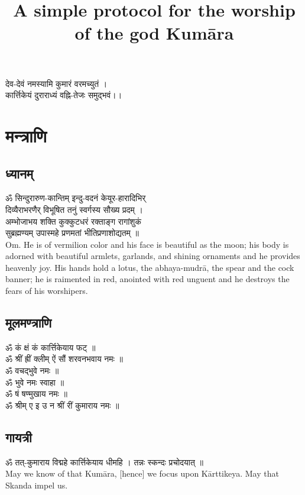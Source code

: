 \documentclass[12pt]{article}
\title{\textbf{A simple protocol for the worship of the god Kumāra}}
\author{}
\date{}
\begin{document}
\maketitle
\begin{center}
{\large {\skt
देव-देवं नमस्यामि कुमारं वरमच्युतं ।\\
कार्त्तिकेयं दुराराध्यं वह्नि-तेजः समुद्भवं।। 
}}\\
 \end{center}
\section{{\skt मन्त्राणि}}
\subsection{{\skt ध्यानम् }}
{\large {\skt ॐ सिन्दुरारुण-कान्तिम् इन्दु-वदनं केयूर-हारादिभिर् \\
दिव्यैराभरणैर् विभूषित तनुं स्वर्गस्य सौख्य प्रदम् ।\\ 
अम्भोजाभय शक्ति कुक्कुटधरं रक्ताङ्ग रागांशुकं \\
सुब्रह्मण्यम् उपास्महे प्रणमतां भीतिप्रणाशोद्यतम् ॥
}}\\[8pt]
Om. He is of vermilion color and his face is beautiful as the moon; his body is adorned with beautiful armlets, garlands, and shining ornaments and he provides heavenly joy. His hands hold a lotus, the abhaya-mudrā, the spear and the cock banner; he is raimented in red, anointed with red unguent and he destroys the fears of his worshipers.
\subsection{{\skt मूलमण्त्राणि }}
{\large{\skt ॐ कं क्षं कं कार्त्तिकेयाय फट् ॥\\
ॐ श्रीं ह्रीं क्लीम् ऐं सौं शरवनभवाय नमः ॥\\
ॐ वचद्भुवे नमः ॥\\
ॐ भुवे नमः स्वाहा ॥\\
ॐ षं षण्मुखाय नमः ॥\\
ॐ श्रीम् ए इ उ न श्रीं रीं कुमाराय नमः ॥}}\\
\subsection{{\skt गायत्री }}
{\large {\skt ॐ तत्-कुमाराय विद्महे कार्त्तिकेयाय धीमहि । तन्नः स्कन्दः प्रचोदयात् ॥
}}\\[8pt]
May we know of that Kumāra, [hence] we focus upon Kārttikeya. May that Skanda impel us.
\end{document}

